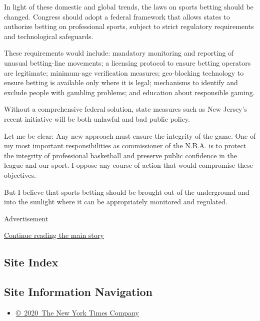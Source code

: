 In light of these domestic and global trends, the laws on sports betting
should be changed. Congress should adopt a federal framework that allows
states to authorize betting on professional sports, subject to strict
regulatory requirements and technological safeguards.

These requirements would include: mandatory monitoring and reporting of
unusual betting-line movements; a licensing protocol to ensure betting
operators are legitimate; minimum-age verification measures;
geo-blocking technology to ensure betting is available only where it is
legal; mechanisms to identify and exclude people with gambling problems;
and education about responsible gaming.

Without a comprehensive federal solution, state measures such as New
Jersey's recent initiative will be both unlawful and bad public policy.

Let me be clear: Any new approach must ensure the integrity of the game.
One of my most important responsibilities as commissioner of the N.B.A.
is to protect the integrity of professional basketball and preserve
public confidence in the league and our sport. I oppose any course of
action that would compromise these objectives.

But I believe that sports betting should be brought out of the
underground and into the sunlight where it can be appropriately
monitored and regulated.

Advertisement

\protect\hyperlink{after-bottom}{Continue reading the main story}

\hypertarget{site-index}{%
\subsection{Site Index}\label{site-index}}

\hypertarget{site-information-navigation}{%
\subsection{Site Information
Navigation}\label{site-information-navigation}}

\begin{itemize}
\tightlist
\item
  \href{https://help.nytimes3xbfgragh.onion/hc/en-us/articles/115014792127-Copyright-notice}{©~2020~The
  New York Times Company}
\end{itemize}

